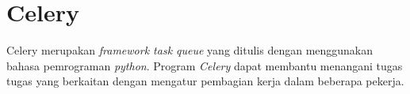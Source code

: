 \textbf{}
%
%
%
%
%
%


\section{Celery}

Celery merupakan \textit{framework task queue} yang ditulis dengan menggunakan bahasa pemrograman \textit{python}. Program \textit{Celery} dapat membantu menangani tugas tugas yang berkaitan dengan mengatur pembagian kerja dalam beberapa pekerja.


